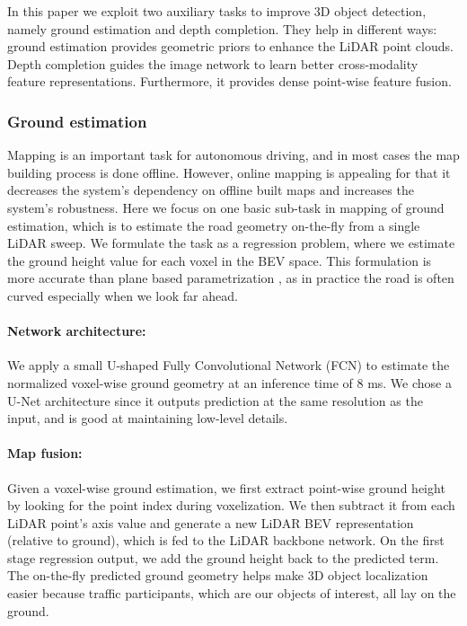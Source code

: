 \documentclass[10pt,twocolumn,letterpaper]{article}
\begin{document}
In this paper we exploit two auxiliary tasks to improve 3D object detection, namely ground estimation and depth completion. They help in different ways: ground estimation provides geometric  priors to enhance the LiDAR point clouds. Depth completion guides the image network to learn better cross-modality feature representations. Furthermore, it provides dense point-wise feature fusion.

\subsubsection{Ground estimation}
Mapping is an important task for autonomous driving, and in most cases the map building process is done offline. However, online mapping is appealing for that it decreases the system's dependency on offline built maps and increases the system's robustness. Here we focus on one basic sub-task in mapping of ground estimation, which is to estimate the road geometry on-the-fly from a single LiDAR sweep. We formulate the task as a regression problem, where we estimate the ground height value for each voxel in the BEV space. This formulation is more accurate than plane based parametrization \cite{3dop, birdnet}, as in practice the road is often   curved especially when we look far ahead.

\paragraph{Network architecture:}
We apply a small U-shaped Fully Convolutional Network (FCN) to estimate the normalized voxel-wise ground geometry at an inference time of 8 ms. We chose a U-Net architecture \cite{unet} since it outputs prediction at the same resolution as the input, and is good at maintaining low-level details.

\paragraph{Map fusion:}
Given a voxel-wise ground estimation, we first extract point-wise ground height by looking for the point index during voxelization. We then subtract it from each LiDAR point's  axis value and generate a new LiDAR BEV representation (relative to ground), which is fed to the LiDAR backbone network. On the first stage regression output, we add the ground height back to the predicted  term. The on-the-fly predicted ground geometry helps make 3D object localization easier because traffic participants, which are our objects of interest, all  lay on the ground.
\end{document}
